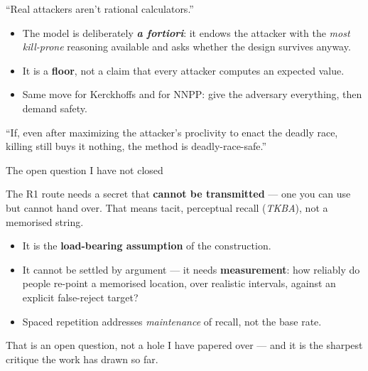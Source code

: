 \documentclass[aspectratio=169,12pt]{beamer}
\newcommand{\punch}[1]{{\color{accentdark}\bfseries #1}}
\begin{document}
\begin{frame}[t]{``Real attackers aren't rational calculators.''}
  \vspace{0.66em}
  \begin{itemize}\setlength\itemsep{0.63em}
    \item {\small The model is deliberately \punch{\emph{a fortiori}}: it endows the
      attacker with the \emph{most kill-prone} reasoning available and asks whether
      the design survives anyway.}
    \item {\small It is a \textbf{floor}, not a claim that every attacker computes an
      expected value.}
    \item {\small Same move for Kerckhoffs and for NNPP: give the adversary
      everything, then demand safety.}
  \end{itemize}
  \vfill
  {\footnotesize\color{graytext}
   ``If, even after maximizing the attacker's proclivity to enact the deadly race,
   killing still buys it nothing, the method is deadly-race-safe.''}
  \vspace{0.17em}
\end{frame}

\begin{frame}[t]{The open question I have not closed}
  \vspace{0.55em}
  {\small The R1 route needs a secret that \textbf{cannot be transmitted} --- one you
   can use but cannot hand over. That means tacit, perceptual recall
   (\emph{TKBA}), not a memorised string.\par}
  \vspace{0.55em}
  \begin{itemize}\setlength\itemsep{0.42em}
    \item {\small It is the \punch{load-bearing assumption} of the construction.}
    \item {\small It cannot be settled by argument --- it needs \textbf{measurement}:
      how reliably do people re-point a memorised location, over realistic
      intervals, against an explicit false-reject target?}
    \item {\small Spaced repetition addresses \emph{maintenance} of recall, not the
      base rate.}
  \end{itemize}
  \vspace{0.44em}
  {\small That is an open question, not a hole I have papered over --- and it is the
   sharpest critique the work has drawn so far.}
\end{frame}
\end{document}
